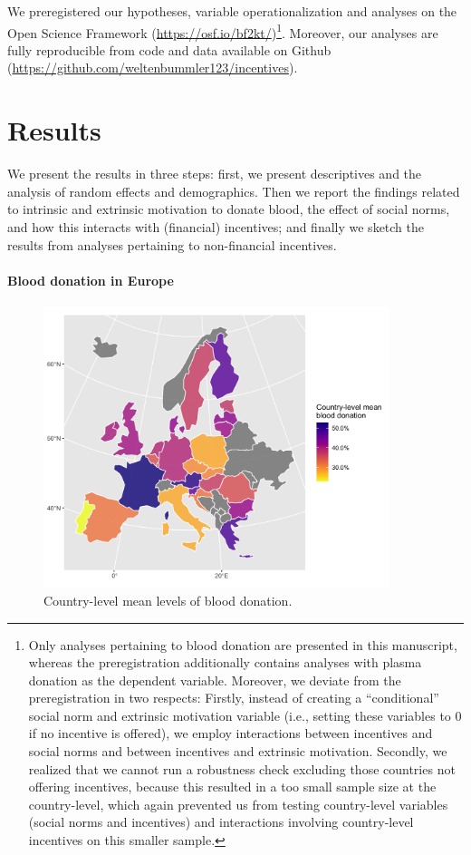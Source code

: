 \documentclass[AER]{AEA}
\begin{document}
We preregistered our hypotheses, variable operationalization and analyses on the Open Science Framework (\url{https://osf.io/bf2kt/})\footnote{Only analyses pertaining to blood donation are presented in this manuscript, whereas the preregistration additionally contains analyses with plasma donation as the dependent variable. Moreover, we deviate from the preregistration in two respects: Firstly, instead of creating a “conditional” social norm and extrinsic motivation variable (i.e., setting these variables to 0 if no incentive is offered), we employ interactions between incentives and social norms and between incentives and extrinsic motivation. Secondly, we realized that we cannot run a robustness check excluding those countries not offering incentives, because this resulted in a too small sample size at the country-level, which again prevented us from testing country-level variables (social norms and incentives) and interactions involving country-level incentives on this smaller sample.}. Moreover, our analyses are fully reproducible from code and data available on Github (\url{https://github.com/weltenbummler123/incentives}).


\section{Results}

We present the results in three steps: first, we present descriptives and the analysis of random effects and demographics. Then we report the findings related to intrinsic and extrinsic motivation to donate blood, the effect of social norms, and how this interacts with (financial) incentives; and finally we sketch the results from analyses pertaining to non-financial incentives.

\paragraph{Blood donation in Europe}

\begin{figure}[b!]
    \centering
    \includegraphics[width=0.9\textwidth]{images/blood_donation.png}
    \caption{Country-level mean levels of blood donation.}
    \label{fig:map_BD}
\end{figure}
\end{document}
